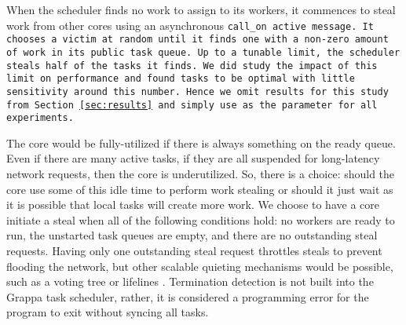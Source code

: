 When the scheduler finds no work to assign to its workers, it
commences to steal work from other cores using an asynchronous
\tt{call_on} active message.  It chooses a victim at random until it
finds one with a non-zero amount of work in its public task queue.  Up
to a tunable limit, the scheduler steals half of the tasks it finds.
We did study the impact of this limit on performance and found
 tasks to be optimal with little sensitivity around this
number.  Hence we omit results for this study from
Section~\ref{sec:results} and simply use  as the
parameter for all experiments.

The
core would be fully-utilized if there is always something on the ready
queue. Even if there are many active tasks, if they are all suspended
for long-latency network requests, then the core is underutilized. So,
there is a choice: should the core use some of this idle time to perform
work stealing or should it just wait as it is possible that local tasks
will create more work. We choose to have a core initiate a steal when
all of the following conditions hold: no workers are ready to run, the
unstarted task queues are empty, and there are no outstanding steal
requests. Having only one outstanding steal request throttles steals to
prevent flooding the network, but other scalable quieting mechanisms
would be possible, such as a voting
tree\cite{scalableWorkStealingOrCilk98} or lifelines \cite{lifelines}.
Termination detection is not built into the Grappa task scheduler,
rather, it is considered a programming error for the program to exit
without syncing all tasks.


